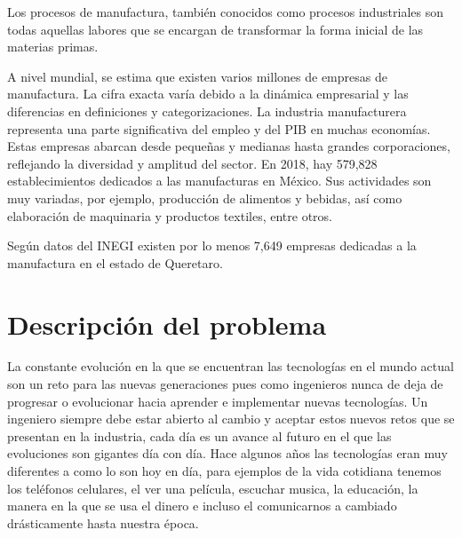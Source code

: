     Los procesos de manufactura, también conocidos como procesos industriales son todas aquellas labores que se encargan de transformar la forma inicial de las materias primas.
    
    A nivel mundial, se estima que existen varios millones de empresas de manufactura. La cifra exacta varía debido a la dinámica empresarial y las diferencias en definiciones y categorizaciones. La industria manufacturera representa una parte significativa del empleo y del PIB en muchas economías. Estas empresas abarcan desde pequeñas y medianas hasta grandes corporaciones, reflejando la diversidad y amplitud del sector.
    En 2018, hay 579,828 establecimientos dedicados a las manufacturas en México. Sus actividades son muy variadas, por ejemplo, producción de alimentos y bebidas, así como elaboración de maquinaria y productos textiles, entre otros.
    
    Según datos del INEGI existen por lo menos 7,649 empresas dedicadas a la manufactura en el estado de Queretaro.
    
        
    \section{Descripción del problema}
    
    La constante evolución en la que se encuentran las tecnologías en el mundo actual son un reto para las nuevas generaciones pues como ingenieros nunca de deja de progresar o evolucionar hacia aprender e implementar nuevas tecnologías. 
    Un ingeniero siempre debe estar abierto al cambio y aceptar estos nuevos retos que se presentan en la industria, cada día es un avance al futuro en el que las evoluciones son gigantes día con día. Hace algunos años las tecnologías eran muy diferentes a como lo son hoy en día, para ejemplos de la vida cotidiana tenemos los teléfonos celulares, el ver una película, escuchar musica, la educación, la manera en la que se usa el dinero e incluso el comunicarnos a cambiado drásticamente hasta nuestra época.
    
